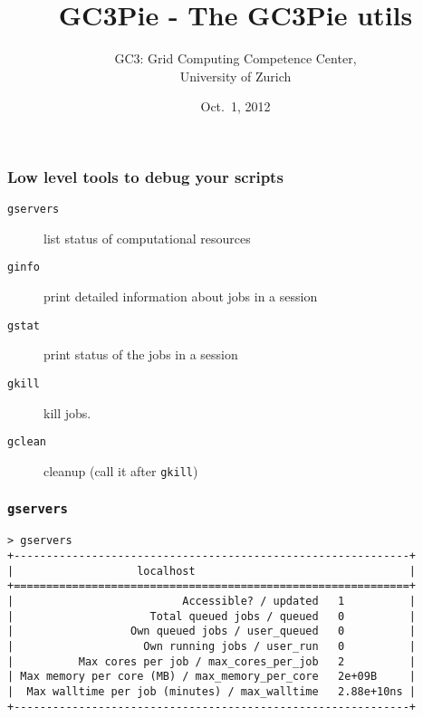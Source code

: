 \documentclass[english,serif,mathserif,xcolor=pdftex,dvipsnames,table]{beamer}
\title[GC3Utils]{%
GC3Pie - The GC3Pie utils
}
\author[Antonio Messina]{%
  GC3: Grid Computing Competence Center, \\
  University of Zurich
}
\date{Oct.~1, 2012}
\begin{document}
\maketitle

\begin{frame}[fragile]
  \frametitle{Low level tools to debug your scripts}
  \begin{description}
  \item[\texttt{gservers}] list status of computational resources
  \item[\texttt{ginfo}] print detailed information about jobs in a session
  \item[\texttt{gstat}] print status of the jobs in a session
  \item[\texttt{gkill}] kill jobs.
  \item[\texttt{gclean}] cleanup (call it after \lstinline|gkill|)
  \end{description}
\end{frame}

\begin{frame}[fragile]
  \frametitle{\texttt{gservers}}
  \begin{lstlisting}[basicstyle=\tt\tiny]
> gservers
+-------------------------------------------------------------+
|                   localhost                                 |
+=============================================================+
|                          Accessible? / updated   1          |
|                     Total queued jobs / queued   0          |
|                  Own queued jobs / user_queued   0          |
|                    Own running jobs / user_run   0          |
|          Max cores per job / max_cores_per_job   2          |
| Max memory per core (MB) / max_memory_per_core   2e+09B     |
|  Max walltime per job (minutes) / max_walltime   2.88e+10ns |
+-------------------------------------------------------------+
  \end{lstlisting}
\end{frame}
\end{document}

